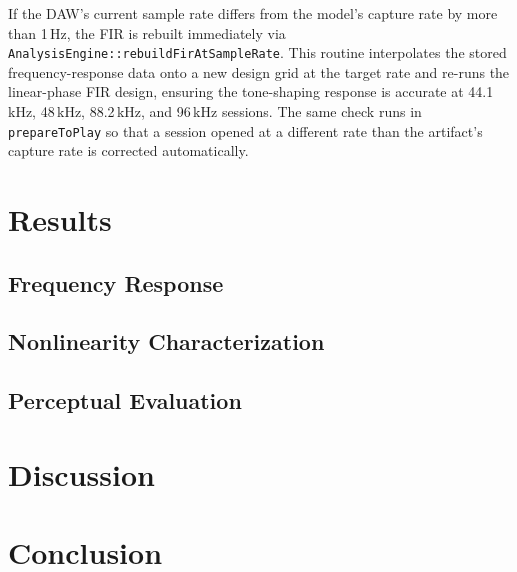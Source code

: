 \documentclass[11pt, letterpaper]{article}
\begin{document}
If the DAW's current sample rate differs from the model's capture rate by
more than 1\,Hz, the FIR is rebuilt immediately via
\texttt{AnalysisEngine::rebuildFirAtSampleRate}.  This routine
interpolates the stored frequency-response data onto a new design grid at
the target rate and re-runs the linear-phase FIR design, ensuring the
tone-shaping response is accurate at 44.1\,kHz, 48\,kHz, 88.2\,kHz, and
96\,kHz sessions.  The same check runs in \texttt{prepareToPlay} so that
a session opened at a different rate than the artifact's capture rate is
corrected automatically.

\section{Results}
\label{sec:results}

\subsection{Frequency Response}

\subsection{Nonlinearity Characterization}

\subsection{Perceptual Evaluation}

\section{Discussion}
\label{sec:discussion}

\section{Conclusion}
\label{sec:conclusion}



\end{document}
